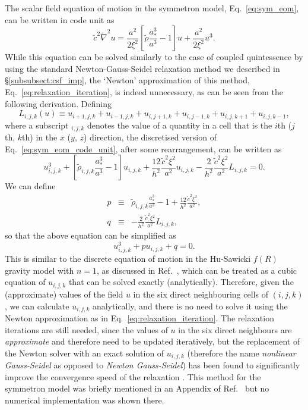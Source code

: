 The scalar field equation of motion in the symmetron model, Eq.~\eqref{eq:sym_eom}, can be written in code unit as
\begin{equation}\label{eq:sym_eom_code_unit}
    \tilde{c}^2\tilde{\nabla}^2u = \frac{a^2}{2\xi^2}\left[\tilde{\rho}\frac{a_\ast^3}{a^3}-1\right]u + \frac{a^2}{2\xi^2}u^3.
\end{equation}
While this equation can be solved similarly to the case of coupled quintessence by using the standard Newton-Gauss-Seidel relaxation method we described in \S\ref{subsubsect:csf_imp}, the `Newton' approximation of this method, Eq.~\eqref{eq:relaxation_iteration}, is indeed unnecessary, as can be seen from the following derivation. Defining
\begin{equation}\label{eq:Lijk}
    L_{i,j,k}(u) \equiv u_{i+1,j,k}+u_{i-1,j,k}+u_{i,j+1,k}+u_{i,j-1,k}+u_{i,j,k+1}+u_{i,j,k-1},
\end{equation}
where a subscript $_{i,j,k}$ denotes the value of a quantity in a cell that is the $i$th ($j$th, $k$th) in the $x$ ($y$, $z$) direction, the discretised version of Eq.~\eqref{eq:sym_eom_code_unit}, after some rearrangement, can be written as
\begin{equation}
    u^3_{i,j,k}+\left[\tilde{\rho}_{i,j,k}\frac{a^3_\ast}{a^3}-1\right]u_{i,j,k} + \frac{12}{h^2}\frac{\tilde{c}^2\xi^2}{a^2}u_{i,j,k} - \frac{2}{h^2}\frac{\tilde{c}^2\xi^2}{a^2}L_{i,j,k} = 0.
\end{equation}
We can define
\begin{eqnarray}
    p &\equiv& \tilde{\rho}_{i,j,k}\frac{a^3_\ast}{a^3}-1 + \frac{12}{h^2}\frac{\tilde{c}^2\xi^2}{a^2},\\
    q &\equiv& - \frac{2}{h^2}\frac{\tilde{c}^2\xi^2}{a^2}L_{i,j,k},
\end{eqnarray}
so that the above equation can be simplified as
\begin{equation}\label{eq:sym_cubic_eqn}
    u^3_{i,j,k} + pu_{i,j,k} + q = 0.
\end{equation}
This is similar to the discrete equation of motion in the Hu-Sawicki $f(R)$ gravity model with $n=1$, as discussed in Ref.~\cite{Bose:2016wms}, which can be treated as a cubic equation of $u_{i,j,k}$ that can be solved exactly (analytically). Therefore, given the (approximate) values of the field $u$ in the six direct neighbouring cells of $(i,j,k)$, we can calculate $u_{i,j,k}$ analytically, and there is no need to solve it using the Newton approximation as in Eq.~\eqref{eq:relaxation_iteration}. The relaxation iterations are still needed, since the values of $u$ in the six direct neighbours are \textit{approximate} and therefore need to be updated iteratively, but the replacement of the Newton solver with an exact solution of $u_{i,j,k}$ (therefore the name \textit{nonlinear Gauss-Seidel} as opposed to \textit{Newton Gauss-Seidel}) has been found to significantly improve the convergence speed of the relaxation \cite{Bose:2016wms}. This method for the symmetron model was briefly mentioned in an Appendix of Ref.~\cite{Bose:2016wms} but no numerical implementation was shown there.

